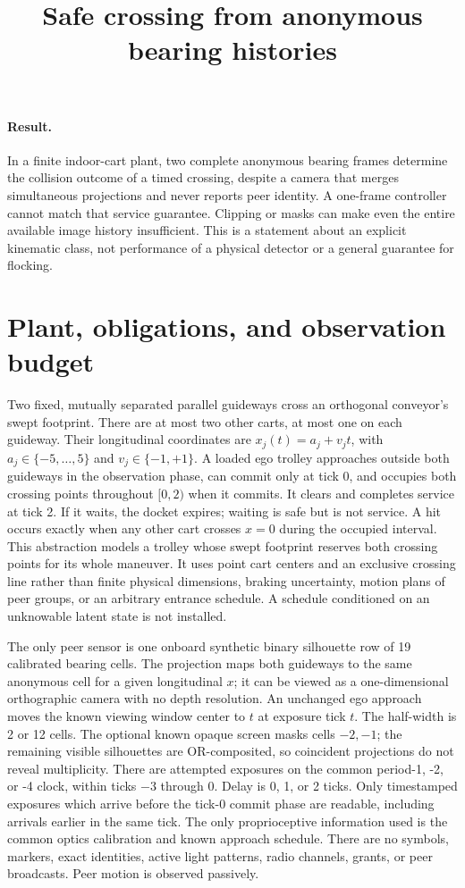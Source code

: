 \documentclass[11pt]{article}
\title{Safe crossing from anonymous bearing histories}
\author{}
\date{}
\begin{document}
\maketitle

\paragraph{Result.}
In a finite indoor-cart plant, two complete anonymous bearing frames determine the collision outcome of a timed crossing, despite a camera that merges simultaneous projections and never reports peer identity. A one-frame controller cannot match that service guarantee. Clipping or masks can make even the entire available image history insufficient. This is a statement about an explicit kinematic class, not performance of a physical detector or a general guarantee for flocking.

\section{Plant, obligations, and observation budget}

Two fixed, mutually separated parallel guideways cross an orthogonal conveyor's swept footprint. There are at most two other carts, at most one on each guideway. Their longitudinal coordinates are $x_j(t)=a_j+v_jt$, with $a_j\in\{-5,\ldots,5\}$ and $v_j\in\{-1,+1\}$. A loaded ego trolley approaches outside both guideways in the observation phase, can commit only at tick 0, and occupies both crossing points throughout $[0,2)$ when it commits. It clears and completes service at tick 2. If it waits, the docket expires; waiting is safe but is not service. A hit occurs exactly when any other cart crosses $x=0$ during the occupied interval. This abstraction models a trolley whose swept footprint reserves both crossing points for its whole maneuver. It uses point cart centers and an exclusive crossing line rather than finite physical dimensions, braking uncertainty, motion plans of peer groups, or an arbitrary entrance schedule. A schedule conditioned on an unknowable latent state is not installed.

The only peer sensor is one onboard synthetic binary silhouette row of 19 calibrated bearing cells. The projection maps both guideways to the same anonymous cell for a given longitudinal $x$; it can be viewed as a one-dimensional orthographic camera with no depth resolution. An unchanged ego approach moves the known viewing window center to $t$ at exposure tick $t$. The half-width is 2 or 12 cells. The optional known opaque screen masks cells $-2,-1$; the remaining visible silhouettes are OR-composited, so coincident projections do not reveal multiplicity. There are attempted exposures on the common period-1, -2, or -4 clock, within ticks $-3$ through 0. Delay is 0, 1, or 2 ticks. Only timestamped exposures which arrive before the tick-0 commit phase are readable, including arrivals earlier in the same tick. The only proprioceptive information used is the common optics calibration and known approach schedule. There are no symbols, markers, exact identities, active light patterns, radio channels, grants, or peer broadcasts. Peer motion is observed passively.
\end{document}

